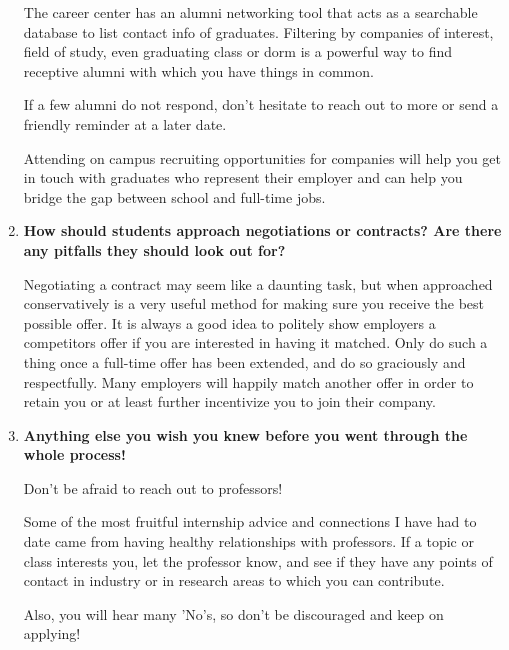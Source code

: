 \documentclass[11pt]{article}
\begin{document}
\begin{enumerate}
The career center has an alumni networking tool that acts as a searchable
database to list contact info of graduates.  Filtering by companies of
interest, field of study, even graduating class or dorm is a powerful way to
find receptive alumni with which you have things in common.  

If a few alumni do not respond, don't hesitate to reach out to more or send a
friendly reminder at a later date.

Attending on campus recruiting opportunities for companies will help you get in
touch with graduates who represent their employer and can help you bridge the
gap between school and full-time jobs.

\item \textbf{How should students approach negotiations or contracts? Are there
    any pitfalls they should look out for?}

Negotiating a contract may seem like a daunting task, but when approached
conservatively is a very useful method for making sure you receive the best
possible offer.  It is always a good idea to politely show employers a
competitors offer if you are interested in having it matched.  Only do such a
thing once a full-time offer has been extended, and do so graciously and
respectfully.  Many employers will happily match another offer in order to
retain you or at least further incentivize you to join their company.

\item \textbf{Anything else you wish you knew before you went through the whole
    process!}

Don't be afraid to reach out to professors!

Some of the most fruitful internship advice and connections I have had to date
came from having healthy relationships with professors.  If a topic or class
interests you, let the professor know, and see if they have any points of
contact in industry or in research areas to which you can contribute.

Also, you will hear many 'No's, so don't be discouraged and keep on applying!

\end{enumerate}
\end{document}
